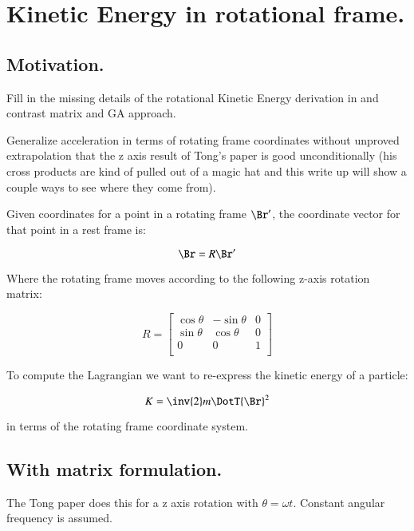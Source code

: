 \chapter{Kinetic Energy in rotational frame.}\label{chap:PJKeRot}
\date{ April 30, 2008.  $RCSfile: keRotation.tex,v $ Last $Revision: 1.10 $ $Date: 2009/06/11 16:45:58 $ }

\section{Motivation. }

Fill in the missing details of the rotational Kinetic Energy derivation in
\cite{TongDynamics}
and contrast matrix and GA approach.

Generalize acceleration in terms
of rotating frame coordinates without unproved extrapolation that the z axis result
of Tong's paper is good unconditionally (his cross products are kind of pulled out of
a magic hat and this write up will show a couple ways to see where they come from).

Given coordinates for a point in a rotating frame $\Br'$, the coordinate vector for that point
in a rest frame is:

\begin{equation}\label{eqn:keRot:rotcoord}
\Br = R \Br'
\end{equation}

Where the rotating frame moves according to the following z-axis rotation matrix:

\[
R = 
\begin{bmatrix}
\cos \theta & -\sin \theta & 0 \\
\sin \theta & \cos \theta & 0 \\
0 & 0 & 1 \\
\end{bmatrix}
\]

To compute the Lagrangian we want to re-express the 
kinetic energy of a particle:

\[
K = 
\inv{2} m \DotT{\Br}^2
\]

in terms of the rotating frame coordinate system.

\section{With matrix formulation. }

The Tong paper does this for a z axis rotation with $\theta = \omega t$.
Constant angular frequency is assumed.

